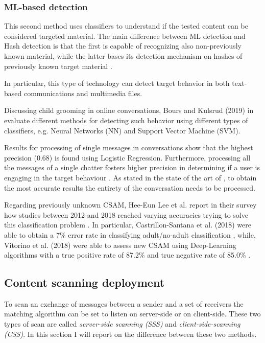 \subsubsection{ML-based detection}
\label{sss:ML}

This second method uses classifiers to understand if the tested content can be considered targeted material. The main difference between ML detection and Hash detection is that the first is capable of recognizing also non-previously known material, while the latter bases its detection mechanism on hashes of previously known target material \cite{abelson2024bugs}. 

In particular, this type of technology can detect target behavior in both text-based communications and multimedia files.

Discussing child grooming in online conversations, Bours and Kulsrud (2019) in \cite{Bours} evaluate different methods for detecting such behavior using different types of classifiers, e.g. Neural Networks (NN) and Support Vector Machine (SVM). 

Results for processing of single messages in conversations show that the highest precision (0.68) is found using Logistic Regression. Furthermore, processing all the messages of a single chatter fosters higher precision in determining if a user is engaging in the target behaviour \cite {Bours}. As stated in the state of the art of \cite{Bours}, to obtain the most accurate results the entirety of the conversation needs to be processed.

Regarding previously unknown CSAM, Hee-Eun Lee et al. report in their survey how studies between 2012 and 2018 reached varying accuracies trying to solve this classification problem \cite{LEE2020301022}. In particular, Castrillon-Santana et al. (2018) were able to obtain a 7\% error rate in classifying adult/no-adult classification \cite{CASTRILLONSANTANA201810}, while, Vitorino et al. (2018) were able to assess new CSAM using Deep-Learning algorithms with a true positive rate of 87.2\% and true negative rate of 85.0\% \cite{VITORINO2018303}.

\subsection{Content scanning deployment}
\label{ss:scanning}

To scan an exchange of messages between a sender and a set of receivers the matching algorithm can be set to listen on server-side or on client-side. These two types of scan are called \textit{server-side scanning (SSS)} and \textit{client-side-scanning (CSS)}. In this section I will report on the difference between these two methods.

